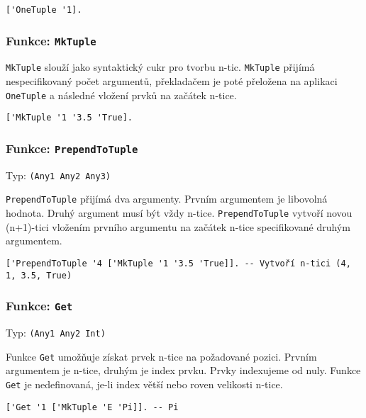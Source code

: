 \begin{lstlisting}[caption={Ukázka využití OneTuple}]
['OneTuple '1].
\end{lstlisting}

\subsubsection*{Funkce: \lstinline{MkTuple}}\label{mk-tuple-fn}

\lstinline{MkTuple} slouží jako syntaktický cukr pro tvorbu n-tic. \lstinline{MkTuple} přijímá
nespecifikovaný počet argumentů, překladačem je poté přeložena na aplikaci \lstinline{OneTuple}
a následné vložení prvků na začátek n-tice.

\begin{lstlisting}[caption={Ukázka využití OneTuple}]
['MkTuple '1 '3.5 'True].
\end{lstlisting}

\subsubsection*{Funkce: \lstinline{PrependToTuple}}
Typ: \lstinline{(Any1 Any2 Any3)}

\lstinline{PrependToTuple} přijímá dva argumenty. Prvním argumentem je libovolná hodnota. Druhý
argument musí být vždy n-tice. \lstinline{PrependToTuple} vytvoří novou (n+1)-tici vložením prvního
argumentu na začátek n-tice specifikované druhým argumentem.

\begin{lstlisting}[caption={Ukázka využití PrependToTuple}]
['PrependToTuple '4 ['MkTuple '1 '3.5 'True]]. -- Vytvoří n-tici (4, 1, 3.5, True)
\end{lstlisting}

\subsubsection*{Funkce: \lstinline{Get}}
Typ: \lstinline{(Any1 Any2 Int)}

Funkce \lstinline{Get} umožňuje získat prvek n-tice na požadované pozici. Prvním argumentem je
n-tice, druhým je index prvku. Prvky indexujeme od nuly. Funkce \lstinline{Get} je nedefinovaná,
je-li index větší nebo roven velikosti n-tice.

\begin{lstlisting}[caption={Ukázka využití Get}]
['Get '1 ['MkTuple 'E 'Pi]]. -- Pi
\end{lstlisting}

